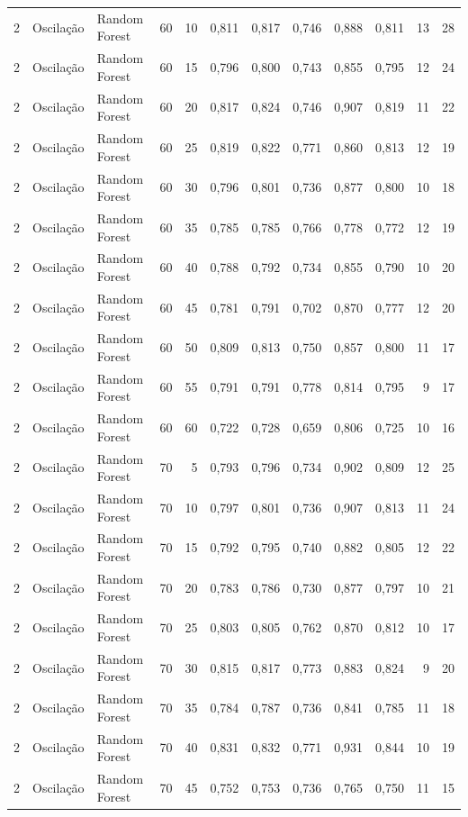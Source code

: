 \begin{longtable}{@{}rllrrrrrrrrr@{}}
2 & Oscilação & Random Forest & 60 & 10 & 0,811 & 0,817 & 0,746 & 0,888 & 0,811 & 13 & 28 \\
2 & Oscilação & Random Forest & 60 & 15 & 0,796 & 0,800 & 0,743 & 0,855 & 0,795 & 12 & 24 \\
2 & Oscilação & Random Forest & 60 & 20 & 0,817 & 0,824 & 0,746 & 0,907 & 0,819 & 11 & 22 \\
2 & Oscilação & Random Forest & 60 & 25 & 0,819 & 0,822 & 0,771 & 0,860 & 0,813 & 12 & 19 \\
2 & Oscilação & Random Forest & 60 & 30 & 0,796 & 0,801 & 0,736 & 0,877 & 0,800 & 10 & 18 \\
2 & Oscilação & Random Forest & 60 & 35 & 0,785 & 0,785 & 0,766 & 0,778 & 0,772 & 12 & 19 \\
2 & Oscilação & Random Forest & 60 & 40 & 0,788 & 0,792 & 0,734 & 0,855 & 0,790 & 10 & 20 \\
2 & Oscilação & Random Forest & 60 & 45 & 0,781 & 0,791 & 0,702 & 0,870 & 0,777 & 12 & 20 \\
2 & Oscilação & Random Forest & 60 & 50 & 0,809 & 0,813 & 0,750 & 0,857 & 0,800 & 11 & 17 \\
2 & Oscilação & Random Forest & 60 & 55 & 0,791 & 0,791 & 0,778 & 0,814 & 0,795 & 9 & 17 \\
2 & Oscilação & Random Forest & 60 & 60 & 0,722 & 0,728 & 0,659 & 0,806 & 0,725 & 10 & 16 \\
2 & Oscilação & Random Forest & 70 & 5 & 0,793 & 0,796 & 0,734 & 0,902 & 0,809 & 12 & 25 \\
2 & Oscilação & Random Forest & 70 & 10 & 0,797 & 0,801 & 0,736 & 0,907 & 0,813 & 11 & 24 \\
2 & Oscilação & Random Forest & 70 & 15 & 0,792 & 0,795 & 0,740 & 0,882 & 0,805 & 12 & 22 \\
2 & Oscilação & Random Forest & 70 & 20 & 0,783 & 0,786 & 0,730 & 0,877 & 0,797 & 10 & 21 \\
2 & Oscilação & Random Forest & 70 & 25 & 0,803 & 0,805 & 0,762 & 0,870 & 0,812 & 10 & 17 \\
2 & Oscilação & Random Forest & 70 & 30 & 0,815 & 0,817 & 0,773 & 0,883 & 0,824 & 9 & 20 \\
2 & Oscilação & Random Forest & 70 & 35 & 0,784 & 0,787 & 0,736 & 0,841 & 0,785 & 11 & 18 \\
2 & Oscilação & Random Forest & 70 & 40 & 0,831 & 0,832 & 0,771 & 0,931 & 0,844 & 10 & 19 \\
2 & Oscilação & Random Forest & 70 & 45 & 0,752 & 0,753 & 0,736 & 0,765 & 0,750 & 11 & 15 \\

\end{longtable}
